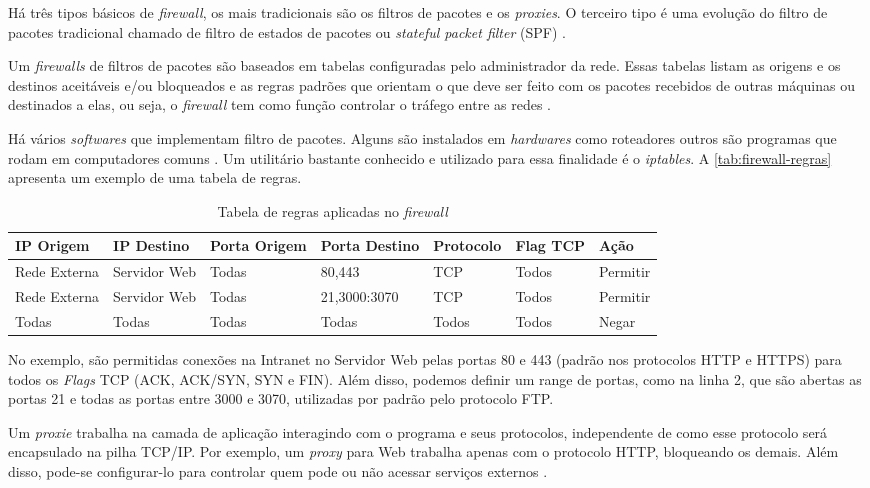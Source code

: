 Há três tipos básicos de \textit{firewall}, os mais tradicionais são os filtros de pacotes e os \textit{proxies}. O terceiro tipo é uma evolução do filtro de pacotes tradicional chamado de filtro de estados de pacotes ou \textit{stateful packet filter} (SPF) \cite{univhacker}.

Um \textit{firewalls} de filtros de pacotes são baseados em tabelas configuradas pelo administrador da rede. Essas tabelas listam as origens e os destinos aceitáveis e/ou bloqueados e as regras padrões que orientam o que deve ser feito com os pacotes recebidos de outras máquinas ou destinados a elas, ou seja, o \textit{firewall} tem como função controlar o tráfego entre as redes \cite{redesdecomputadores}. 

Há vários \textit{softwares} que implementam filtro de pacotes. Alguns são instalados em \textit{hardwares} como roteadores outros são programas que rodam em computadores comuns \cite{univhacker}. Um utilitário bastante conhecido e utilizado para essa finalidade é o \textit{iptables}. A \autoref{tab:firewall-regras} apresenta um exemplo de uma tabela de regras.

\begin{table}[htb]
\ABNTEXfontereduzida
\centering
\caption{Tabela de regras aplicadas no \textit{firewall}}
\label{tab:firewall-regras}
\begin{tabular}{l|l|l|l|l|l|l}
    \textbf{IP Origem} & \textbf{IP Destino}  & \textbf{Porta Origem}  & \textbf{Porta Destino} & \textbf{Protocolo} & \textbf{Flag TCP} & \textbf{Ação} \\ \hline
    Rede Externa & Servidor Web & Todas & 80,443 & TCP & Todos & Permitir \\ \hline
    Rede Externa & Servidor Web & Todas & 21,3000:3070 & TCP & Todos & Permitir \\ \hline
    Todas & Todas & Todas & Todas & Todos & Todos & Negar \\
\end{tabular}
\end{table}

No exemplo, são permitidas conexões na Intranet no Servidor Web pelas portas 80 e 443 (padrão nos protocolos HTTP e HTTPS) para todos os \textit{Flags} TCP (ACK, ACK/SYN, SYN e FIN). Além disso, podemos definir um range de portas, como na linha 2, que são abertas as portas 21 e todas as portas entre 3000 e 3070, utilizadas por padrão pelo protocolo FTP.

Um \textit{proxie} trabalha na camada de aplicação interagindo com o programa e seus protocolos, independente de como esse protocolo será encapsulado na pilha TCP/IP. Por exemplo, um \textit{proxy} para Web trabalha apenas com o protocolo HTTP, bloqueando os demais. Além disso, pode-se configurar-lo para controlar quem pode ou não acessar serviços externos \cite{univhacker}.

